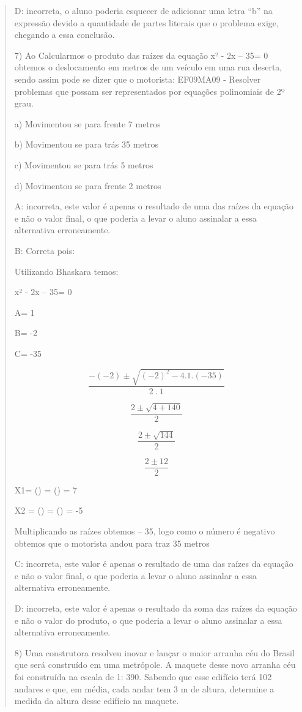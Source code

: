 \begin{quote}
\begin{escolha}
D: incorreta, o aluno poderia esquecer de adicionar uma letra ``b'' na
expressão devido a quantidade de partes literais que o problema exige,
chegando a essa conclusão.

7) Ao Calcularmos o produto das raízes da equação x² - 2x -- 35= 0
obtemos o deslocamento em metros de um veículo em uma rua deserta, sendo
assim pode se dizer que o motorista: EF09MA09 - Resolver problemas que
possam ser representados por equações polinomiais de 2º grau.

a) Movimentou se para frente 7 metros

b) Movimentou se para trás 35 metros

c) Movimentou se para trás 5 metros

d) Movimentou se para frente 2 metros

A: incorreta, este valor é apenas o resultado de uma das raízes da
equação e não o valor final, o que poderia a levar o aluno assinalar a
essa alternativa erroneamente.

B: Correta pois:

Utilizando Bhaskara temos:

x² - 2x -- 35= 0

A= 1

B= -2

C= -35

\[\frac{- ( - 2) \pm \sqrt{{( - 2)}^{2} - 4.1.( - 35)}}{2\ .\ 1}\]

\[\frac{2 \pm \sqrt{4 + 140}}{2}\]

\[\frac{2 \pm \sqrt{144}}{2}\]

\[\frac{2 \pm 12}{2}\]

X1= () = () = 7

X2 = () = () = -5

Multiplicando as raízes obtemos -- 35, logo como o número é negativo
obtemos que o motorista andou para traz 35 metros

C: incorreta, este valor é apenas o resultado de uma das raízes da
equação e não o valor final, o que poderia a levar o aluno assinalar a
essa alternativa erroneamente.

D: incorreta, este valor é apenas o resultado da soma das raízes da
equação e não o valor do produto, o que poderia a levar o aluno
assinalar a essa alternativa erroneamente.

8) Uma construtora resolveu inovar e lançar o maior arranha céu do
Brasil que será construído em uma metrópole. A maquete desse novo
arranha céu foi construída na escala de 1: 390. Sabendo que esse
edifício terá 102 andares e que, em média, cada andar tem 3 m de altura,
determine a medida da altura desse edifício na maquete.


\end{escolha}
\end{quote}
